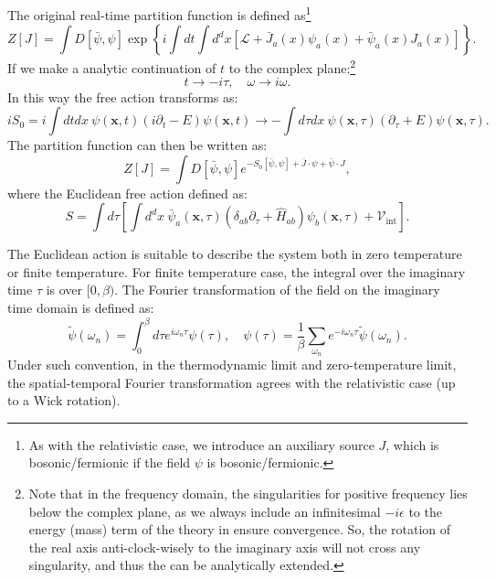 \documentclass[aps,prb,superscriptaddress,nofootinbib]{revtex4}
\begin{document}
The original real-time partition function is defined as\footnote{As with the relativistic case, we introduce an auxiliary source $J$, which is bosonic/fermionic if the field $\psi$ is bosonic/fermionic.
}
\begin{equation}
	Z[J] = \int D[\bar\psi,\psi] \exp\left\{i\int dt \int d^dx \left[\mathcal{L}+\bar{J}_a(x)\psi_a(x)+\bar{\psi}_a(x)J_a(x)\right]\right\}.
\end{equation}
If we make a analytic continuation of $t$ to the complex plane:\footnote{Note that in the frequency domain, the singularities for positive frequency lies below the complex plane, as we always include an infinitesimal $-i\epsilon$ to the energy (mass) term of the theory in ensure convergence. So, the rotation of the real axis anti-clock-wisely to the imaginary axis will not cross any singularity, and thus the can be analytically extended.}
\begin{equation}
	t \rightarrow -i\tau, \quad \omega \rightarrow i\omega.
\end{equation}
In this way the free action transforms as:
\begin{equation*}
	iS_0 = i \int dt dx\ \psi(\bm x, t) (i\partial_t - E) \psi(\bm x, t) \rightarrow 
	-\int d\tau dx\ \psi(\bm x, \tau) (\partial_\tau + E) \psi(\bm x, \tau).
\end{equation*}
The partition function can then be written as:
\begin{equation}
	Z[J] = \int D[\bar\psi,\psi] e^{-S_0[\bar\psi,\psi]+\bar{J}\cdot\psi+\bar{\psi}\cdot J},
\end{equation}
where the Euclidean free action defined as:
\begin{equation}
	S = \int d\tau \left[\int d^dx\ \bar\psi_a(\bm x,\tau) (\delta_{ab}\partial_\tau+\hat H_{ab})\psi_b(\bm x,\tau) + \mathcal{V}_\mathrm{int}\right].
\end{equation}

The Euclidean action is suitable to describe the system both in zero temperature or finite temperature.
For finite temperature case, the integral over the imaginary time $\tau$ is over $[0,\beta)$.
The Fourier transformation of the field on the imaginary time domain is defined as:
\begin{equation}
	\tilde\psi(\omega_n) = \int_0^\beta d\tau e^{i\omega_n\tau} \psi(\tau),\quad
	\psi(\tau) = \frac{1}{\beta}\sum_{\omega_n} e^{-i\omega_n\tau} \tilde\psi(\omega_n).
\end{equation}
Under such convention, in the thermodynamic limit and zero-temperature limit, the spatial-temporal Fourier transformation agrees with the relativistic case (up to a Wick rotation).
\end{document}
